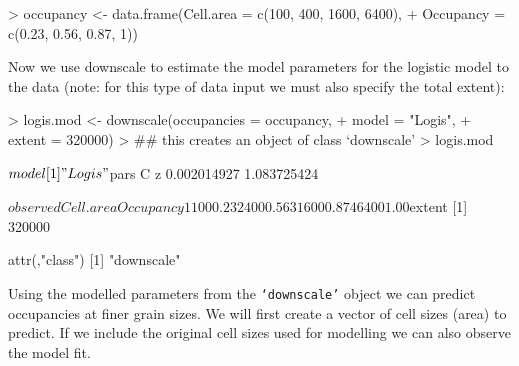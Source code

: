\documentclass{article}[12pt, a4paper]
\begin{document}
\begin{Schunk}
\begin{Sinput}
> occupancy <- data.frame(Cell.area = c(100, 400, 1600, 6400),
+                         Occupancy = c(0.23, 0.56, 0.87, 1))
\end{Sinput}
\end{Schunk}

Now we use downscale to estimate the model parameters for the logistic model to the data (note: for this type of data input we must also specify the total extent):

\begin{Schunk}
\begin{Sinput}
> logis.mod <- downscale(occupancies = occupancy,
+                        model = "Logis",
+                        extent = 320000)
> ## this creates an object of class ‘downscale’
> logis.mod
\end{Sinput}
\begin{Soutput}
$model
[1] "Logis"

$pars
          C           z 
0.002014927 1.083725424 

$observed
  Cell.area Occupancy
1       100      0.23
2       400      0.56
3      1600      0.87
4      6400      1.00

$extent
[1] 320000

attr(,"class")
[1] "downscale"

\end{Soutput}
\end{Schunk}

Using the modelled parameters from the \texttt{‘downscale’} object we can predict occupancies at finer grain sizes. We will first create a vector of cell sizes (area) to predict. If we include the original cell sizes used for modelling we can also observe the model fit.
\end{document}
